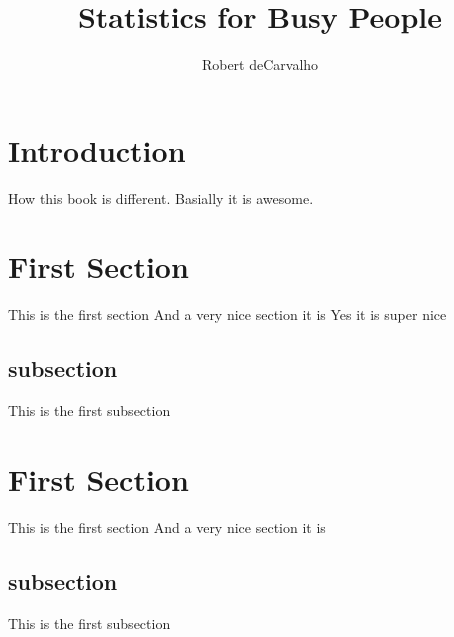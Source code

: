\documentclass[11pt, oneside]{article}   	%
\title{Statistics for Busy People}
\author{Robert deCarvalho}
\date{}							%
\begin{document}
\maketitle

\section{Introduction}
How this book is different. \break
Basially it is awesome.


\section{First Section}
This is the first section
And a very nice section it is
Yes it is super nice
\subsection{subsection}
This is the first subsection

\section{First Section}
This is the first section
And a very nice section it is
\subsection{subsection}
This is the first subsection
\end{document}

